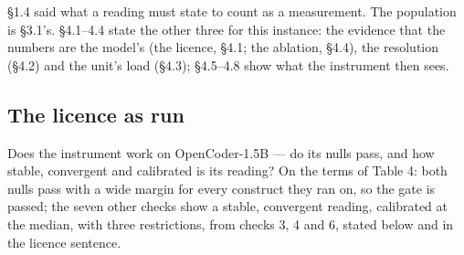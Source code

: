 \documentclass{article}
\begin{document}
\S1.4 said what a reading must state to count as a measurement. The population is \S3.1's. \S4.1--4.4 state the other three for this instance: the evidence that the numbers are the model's (the licence, \S4.1; the ablation, \S4.4), the resolution (\S4.2) and the unit's load (\S4.3); \S4.5--4.8 show what the instrument then sees.

\subsection{The licence as run}

Does the instrument work on OpenCoder-1.5B --- do its nulls pass, and how stable, convergent and calibrated is its reading? On the terms of Table 4: both nulls pass with a wide margin for every construct they ran on, so the gate is passed; the seven other checks show a stable, convergent reading, calibrated at the median, with three restrictions, from checks 3, 4 and 6, stated below and in the licence sentence.
\end{document}
